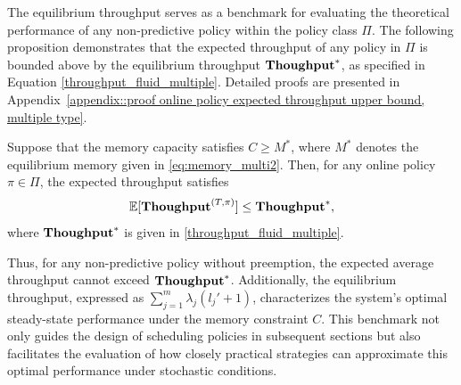 The equilibrium throughput serves as a benchmark for evaluating the theoretical performance of any non-predictive policy within the policy class \(\Pi\). The following proposition demonstrates that the expected throughput of any policy in \(\Pi\) is bounded above by the equilibrium throughput \(\textbf{Thoughput}^*\), as specified in Equation \eqref{throughput_fluid_multiple}. Detailed proofs are presented in Appendix~\ref{appendix::proof online policy expected throughput upper bound, multiple type}.
\begin{proposition}\label{prop::online policy expected throughput upper bound, multiple type}
Suppose that the memory capacity satisfies \(C \geq M^*\), where \(M^*\) denotes the equilibrium memory given in \eqref{eq:memory_multi2}. Then, for any online policy \(\pi \in \Pi\), the expected throughput satisfies
\[
\mathbb{E}[\textbf{Thoughput}^{(T,\pi)}] \leq \textbf{Thoughput}^*,
\]
where \(\textbf{Thoughput}^*\) is given in \eqref{throughput_fluid_multiple}.
\end{proposition}
Thus, for any non-predictive policy without preemption, the expected average throughput cannot exceed \(\textbf{Thoughput}^*\). Additionally, the equilibrium throughput, expressed as \(\sum_{j=1}^m \lambda_j (l_j' + 1)\), characterizes the system’s optimal steady-state performance under the memory constraint \(C\). This benchmark not only guides the design of scheduling policies in subsequent sections but also facilitates the evaluation of how closely practical strategies can approximate this optimal performance under stochastic conditions.




